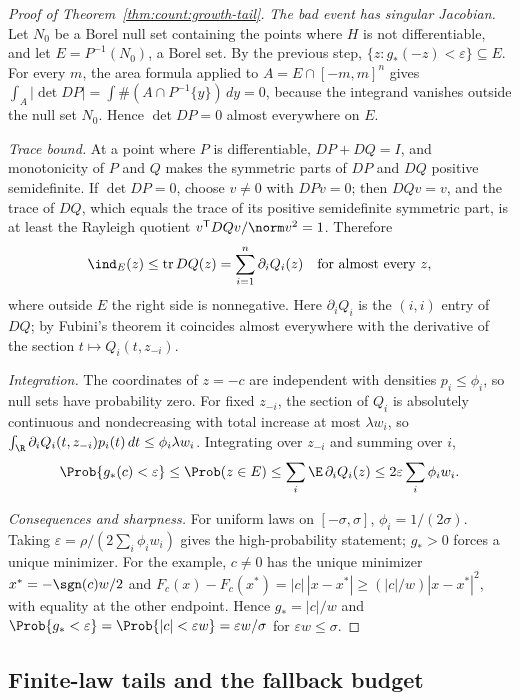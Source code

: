\begin{proof}[Proof of Theorem~\ref{thm:count:growth-tail}]
\emph{The bad event has singular Jacobian.} Let $N_0$ be a Borel null set
containing the points where $H$ is not differentiable, and let
$E=P^{-1}(N_0)$, a Borel set. By the previous step,
$\{z:g_*(-z)<\varepsilon\}\subseteq E$. For every $m$, the area formula
applied to $A=E\cap[-m,m]^n$ gives
$\int_A|\det DP|=\int\#(A\cap P^{-1}\{y\})\,dy=0$, because the integrand
vanishes outside the null set $N_0$. Hence $\det DP=0$ almost everywhere on
$E$.

\emph{Trace bound.} At a point where $P$ is differentiable,
$DP+DQ=I$, and monotonicity of $P$ and $Q$ makes the symmetric parts of $DP$
and $DQ$ positive semidefinite. If $\det DP=0$, choose $v\ne0$ with $DPv=0$;
then $DQv=v$, and the trace of $DQ$, which equals the trace of its positive
semidefinite symmetric part, is at least the Rayleigh quotient
$v^{\mathsf T} DQv/\norm v^2=1$. Therefore
\[
 \ind_E(z)\le\operatorname{tr}DQ(z)=\sum_{i=1}^n\partial_iQ_i(z)
 \quad\text{for almost every }z,
\]
where outside $E$ the right side is nonnegative. Here $\partial_iQ_i$ is the
$(i,i)$ entry of $DQ$; by Fubini's theorem it coincides almost everywhere with
the derivative of the section $t\mapsto Q_i(t,z_{-i})$.

\emph{Integration.} The coordinates of $z=-c$ are independent with densities
$p_i\le\phi_i$, so null sets have probability zero. For fixed $z_{-i}$, the
section of $Q_i$ is absolutely continuous and nondecreasing with total
increase at most $\lambda w_i$, so
$\int_\R\partial_iQ_i(t,z_{-i})p_i(t)\,dt\le\phi_i\lambda w_i$. Integrating
over $z_{-i}$ and summing over $i$,
\[
 \Prob\{g_*(c)<\varepsilon\}\le\Prob(z\in E)\le\sum_i\E\,\partial_iQ_i(z)
 \le2\varepsilon\sum_i\phi_iw_i .
\]

\emph{Consequences and sharpness.} For uniform laws on $[-\sigma,\sigma]$,
$\phi_i=1/(2\sigma)$. Taking $\varepsilon=\rho/(2\sum_i\phi_iw_i)$ gives the
high-probability statement; $g_*>0$ forces a unique minimizer. For the
example, $c\ne0$ has the unique minimizer $x^*=-\sgn(c)w/2$ and
$F_c(x)-F_c(x^*)=|c|\,|x-x^*|\ge(|c|/w)|x-x^*|^2$, with equality at the other
endpoint. Hence $g_*=|c|/w$ and
$\Prob\{g_*<\varepsilon\}=\Prob\{|c|<\varepsilon w\}=\varepsilon w/\sigma$
for $\varepsilon w\le\sigma$.
\end{proof}

\subsection{Finite-law tails and the fallback budget}

